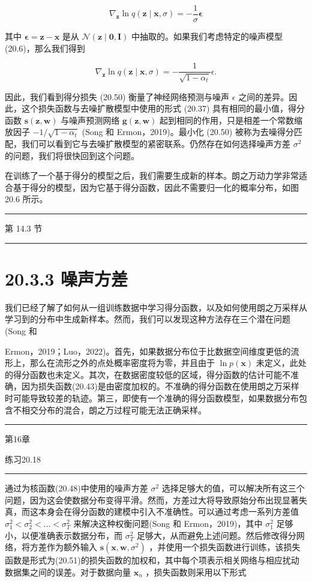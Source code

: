 \documentclass[10pt]{article}
\newcommand{\HRule}{\begin{center}\rule{0.9\linewidth}{0.2mm}\end{center}}
\begin{document}
\[
{\nabla }_{\mathbf{z}}\ln q\left( {\mathbf{z} \mid  \mathbf{x},\sigma }\right)  =  - \frac{1}{\sigma }\mathbf{\epsilon } \tag{20.52}
\]

其中 \(\mathbf{\epsilon } = \mathbf{z} - \mathbf{x}\) 是从 \(\mathcal{N}\left( {\mathbf{z} \mid  \mathbf{0},\mathbf{I}}\right)\) 中抽取的。如果我们考虑特定的噪声模型 (20.6)，那么我们得到

\[
{\nabla }_{\mathbf{z}}\ln q\left( {\mathbf{z} \mid  \mathbf{x},\sigma }\right)  =  - \frac{1}{\sqrt{1 - {\alpha }_{t}}}\epsilon . \tag{20.53}
\]

因此，我们看到得分损失 (20.50) 衡量了神经网络预测与噪声 \(\epsilon\) 之间的差异。因此，这个损失函数与去噪扩散模型中使用的形式 (20.37) 具有相同的最小值，得分函数 \(\mathbf{s}\left( {\mathbf{z},\mathbf{w}}\right)\) 与噪声预测网络 \(\mathbf{g}\left( {\mathbf{z},\mathbf{w}}\right)\) 起到相同的作用，只是相差一个常数缩放因子 \(- 1/\sqrt{1 - {\alpha }_{t}}\) (Song 和 Ermon，2019)。最小化 (20.50) 被称为去噪得分匹配，我们可以看到它与去噪扩散模型的紧密联系。仍然存在如何选择噪声方差 \({\sigma }^{2}\) 的问题，我们将很快回到这个问题。

在训练了一个基于得分的模型之后，我们需要生成新的样本。朗之万动力学非常适合基于得分的模型，因为它基于得分函数，因此不需要归一化的概率分布，如图 20.6 所示。

\HRule

第 14.3 节

\HRule

\section*{20.3.3 噪声方差}

我们已经了解了如何从一组训练数据中学习得分函数，以及如何使用朗之万采样从学习到的分布中生成新样本。然而，我们可以发现这种方法存在三个潜在问题(Song 和

Ermon，2019；Luo，2022)。首先，如果数据分布位于比数据空间维度更低的流形上，那么在流形之外的点处概率密度将为零，并且由于 \(\ln p\left( \mathbf{x}\right)\) 未定义，此处的得分函数也未定义。其次，在数据密度较低的区域，得分函数的估计可能不准确，因为损失函数(20.43)是由密度加权的。不准确的得分函数在使用朗之万采样时可能导致较差的轨迹。第三，即使有一个准确的得分函数模型，如果数据分布包含不相交分布的混合，朗之万过程可能无法正确采样。

\HRule

第16章

练习20.18

\HRule

通过为核函数(20.48)中使用的噪声方差 \({\sigma }^{2}\) 选择足够大的值，可以解决所有这三个问题，因为这会使数据分布变得平滑。然而，方差过大将导致原始分布出现显著失真，而这本身会在得分函数的建模中引入不准确性。可以通过考虑一系列方差值 \({\sigma }_{1}^{2} < {\sigma }_{2}^{2} < \ldots  < {\sigma }_{T}^{2}\) 来解决这种权衡问题(Song 和 Ermon，2019)，其中 \({\sigma }_{1}^{2}\) 足够小，以便准确表示数据分布，而 \({\sigma }_{T}^{2}\) 足够大，从而避免上述问题。然后修改得分网络，将方差作为额外输入 \(\mathbf{s}\left( {\mathbf{x},\mathbf{w},{\sigma }^{2}}\right)\) ，并使用一个损失函数进行训练，该损失函数是形式为(20.51)的损失函数的加权和，其中每个项表示相关网络与相应扰动数据集之间的误差。对于数据向量 \({\mathbf{x}}_{n}\) ，损失函数则采用以下形式
\end{document}
